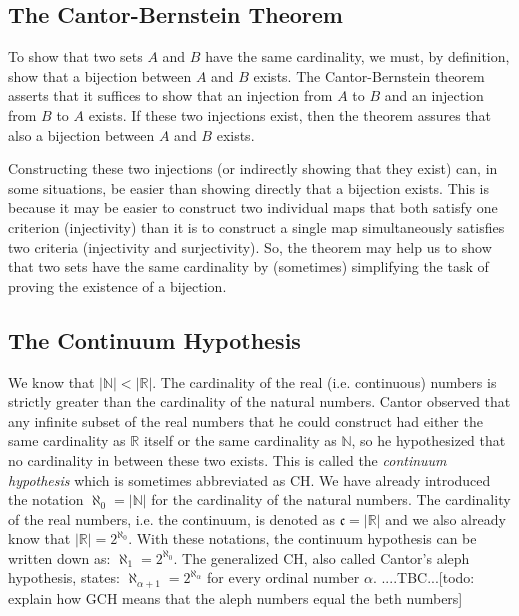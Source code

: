 \subsection{The Cantor-Bernstein Theorem}
To show that two sets $A$ and $B$ have the same cardinality, we must, by definition, show that a bijection between $A$ and $B$ exists. The Cantor-Bernstein theorem asserts that it suffices to show that an injection from $A$ to $B$ and an injection from $B$ to $A$ exists. If these two injections exist, then the theorem assures that also a bijection between $A$ and $B$ exists. 

\medskip
Constructing these two injections (or indirectly showing that they exist) can, in some situations, be easier than showing directly that a bijection exists. This is because it may be easier to construct two individual maps that both satisfy one criterion (injectivity) than it is to construct a single map simultaneously satisfies two criteria (injectivity and surjectivity). So, the theorem may help us to show that two sets have the same cardinality by (sometimes) simplifying the task of proving the existence of a bijection.



\subsection{The Continuum Hypothesis}
We know that $|\mathbb{N}| < |\mathbb{R}|$. The cardinality of the real (i.e. continuous) numbers is strictly greater than the cardinality of the natural numbers. Cantor observed that any infinite subset of the real numbers that he could construct had either the same cardinality as $\mathbb{R}$ itself or the same cardinality as $\mathbb{N}$, so he hypothesized that no cardinality in between these two exists. This is called the \emph{continuum hypothesis} which is sometimes abbreviated as CH. We have already introduced the notation $\aleph_0 = |\mathbb{N}|$ for the cardinality of the natural numbers. The cardinality of the real numbers, i.e. the continuum, is denoted as $\mathfrak{c} = |\mathbb{R}|$ and we also already know that $|\mathbb{R}| = 2^{\aleph_0}$. With these notations, the continuum hypothesis can be written down as: $\aleph_1 = 2^{\aleph_0}$. The generalized CH, also called Cantor's aleph hypothesis, states: $\aleph_{\alpha+1} = 2^{\aleph_{\alpha}}$ for every ordinal number $\alpha$. ....TBC...[todo: explain how GCH means that the aleph numbers equal the beth numbers]


